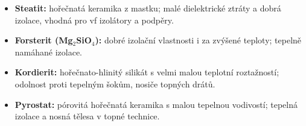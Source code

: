 \begin{itemize}
\item \textbf{Steatit:} hořečnatá keramika z mastku; malé dielektrické ztráty a dobrá izolace, vhodná pro vf izolátory a podpěry.
\item \textbf{Forsterit (Mg$_2$SiO$_4$):} dobré izolační vlastnosti i za zvýšené teploty; tepelně namáhané izolace.
\item \textbf{Kordierit:} hořečnato-hlinitý silikát s velmi malou teplotní roztažností; odolnost proti tepelným šokům, nosiče topných drátů.
\item \textbf{Pyrostat:} pórovitá hořečnatá keramika s malou tepelnou vodivostí; tepelná izolace a nosná tělesa v topné technice.
\end{itemize}
